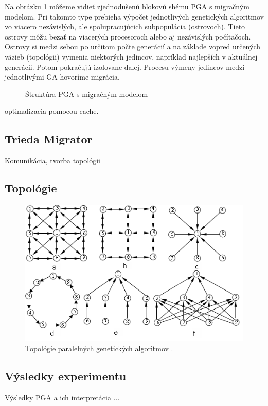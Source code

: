 Na obrázku \ref{img:pga} môžeme vidieť zjednodušenú blokovú shému PGA s migračným modelom. Pri takomto type prebieha výpočet jednotlivých genetických algoritmov vo viacero nezávislých, ale spolupracujúcich subpopulácia (ostrovoch). Tieto ostrovy môžu bezať na viacerých procesoroch alebo aj nezávislých počítačoch.
Ostrovy si medzi sebou po určitom počte generácií a na základe vopred určených väzieb (topológii) vymenia niektorých jedincov, napríklad najlepších v aktuálnej generácii. Potom pokračujú izolovane dalej. Procesu výmeny jedincov medzi jednotlivými GA hovoríme migrácia.
\begin{figure}[!h]
  \centering
  
  \caption{Štruktúra PGA s migračným modelom}
  \label{img:pga}
\end{figure}
optimalizacia pomocou cache. 
\subsection{Trieda Migrator}
Komunikácia, tvorba topológii
\subsection{Topológie}

\begin{figure}[!htbp]
  \centering
  \includegraphics[width=\textwidth]{img/topology.png}
  \caption{Topológie paralelných genetických algoritmov \cite{pea}.}
  \label{img:topology}
\end{figure}
\subsection{Výsledky experimentu}
Výsledky PGA a ich interpretácia
...


